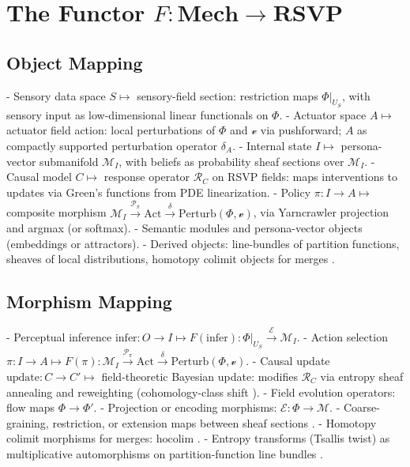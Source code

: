 \documentclass{article}
\theoremstyle{plain}
\theoremstyle{definition}
\begin{document}
\section{The Functor $F: \mathbf{Mech} \to \mathbf{RSVP}$}

\subsection{Object Mapping}
- Sensory data space $S \mapsto$ sensory-field section: restriction maps $\Phi|_{U_S}$, with sensory input as low-dimensional linear functionals on $\Phi$.
- Actuator space $A \mapsto$ actuator field action: local perturbations of $\Phi$ and $\mathcal{v}$ via pushforward; $A$ as compactly supported perturbation operator $\delta_A$.
- Internal state $I \mapsto$ persona-vector submanifold $\mathcal{M}_I$, with beliefs as probability sheaf sections over $\mathcal{M}_I$.
- Causal model $C \mapsto$ response operator $\mathcal{R}_C$ on RSVP fields: maps interventions to updates via Green’s functions from PDE linearization.
- Policy $\pi: I \to A \mapsto$ composite morphism $\mathcal{M}_I \xrightarrow{\mathcal{P}_\pi} \text{Act} \xrightarrow{\delta} \text{Perturb}(\Phi, \mathcal{v})$, via Yarncrawler projection and argmax (or softmax).
- Semantic modules and persona-vector objects (embeddings or attractors).
- Derived objects: line-bundles of partition functions, sheaves of local distributions, homotopy colimit objects for merges \cite{MacLane1992,Awodey2010}.

\subsection{Morphism Mapping}
- Perceptual inference $\text{infer}: O \to I \mapsto F(\text{infer}): \Phi|_{U_S} \xrightarrow{\mathcal{E}} \mathcal{M}_I$.
- Action selection $\pi: I \to A \mapsto F(\pi): \mathcal{M}_I \xrightarrow{\mathcal{P}_\pi} \text{Act} \xrightarrow{\delta} \text{Perturb}(\Phi, \mathcal{v})$.
- Causal update $\text{update}: C \to C' \mapsto$ field-theoretic Bayesian update: modifies $\mathcal{R}_C$ via entropy sheaf annealing and reweighting (cohomology-class shift \cite{MacLane1992}).
- Field evolution operators: flow maps $\Phi \to \Phi'$.
- Projection or encoding morphisms: $\mathcal{E}: \Phi \to \mathcal{M}$.
- Coarse-graining, restriction, or extension maps between sheaf sections \cite{MacLane1992}.
- Homotopy colimit morphisms for merges: $\text{hocolim}$ \cite{Awodey2010}.
- Entropy transforms (Tsallis twist) as multiplicative automorphisms on partition-function line bundles \cite{Tsallis1988}.
\end{document}
